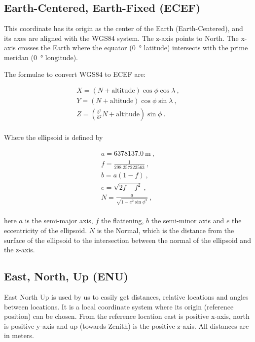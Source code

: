 \subsection{Earth-Centered, Earth-Fixed (ECEF)}

This coordinate has its origin as the center of the Earth
(Earth-Centered), and its axes are aligned with the WGS84 system. The
z-axis points to North. The x-axis crosses the Earth where the equator
(\SI{0}{\degree} latitude) intersects with the prime meridan
(\SI{0}{\degree} longitude).

The formulae to convert WGS84 to ECEF are:

\begin{equation}
    \begin{array}{l}
        X = (N + \mathrm{altitude}) \cos{\phi} \cos{\lambda} \ , \\
        Y = (N + \mathrm{altitude}) \cos{\phi} \sin{\lambda} \ , \\
        Z = (\frac{b^2}{a^2} N + \mathrm{altitude}) \sin{\phi} \ . \\
    \end{array}
\end{equation}

Where the ellipsoid is defined by

\begin{equation}
    \label{eq:wgs84}
    \begin{array}{l}
        a = \SI{6378137.0}{\meter} \ , \\
        f = \frac{1}{298.257223563} \ , \\
        b = a (1 - f) \ , \\
        e = \sqrt{2 f - f^2} \ , \\
        N = \frac{a}{\sqrt{1 - e^2 \sin{\phi}^2}} \ , \\
    \end{array}
\end{equation}

\noindent
here $a$ is the semi-major axis, $f$ the flattening, $b$ the semi-minor
axis and $e$ the eccentricity of the ellipsoid. $N$ is the Normal, which
is the distance from the surface of the ellipsoid to the intersection
between the normal of the ellipsoid and the z-axis.


\subsection{East, North, Up (ENU)}

East North Up is used by us to easily get distances, relative locations
and angles between locations. It is a local coordinate system where its
origin (reference position) can be chosen. From the reference location
east is positive x-axis, north is positive y-axis and up (towards
Zenith) is the positive z-axis. All distances are in meters.

